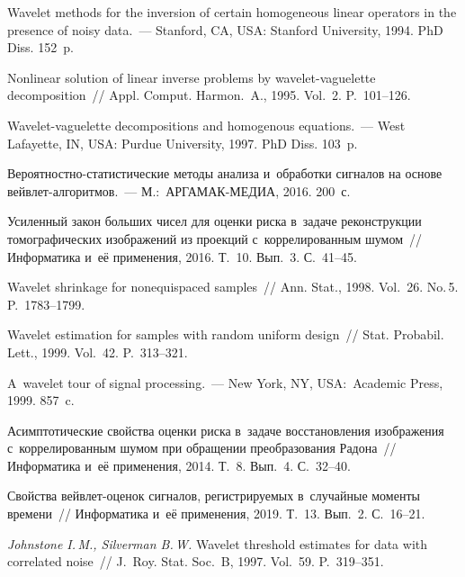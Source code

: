 \begin{multicols}{2}
{\small\frenchspacing
 {%
 \begin{thebibliography}{99}



 Wavelet methods for the inversion of certain 
homogeneous linear operators in the presence of noisy data.~--- 
Stanford, CA, USA: Stanford University, 1994. PhD Diss. 152~p. 

 Nonlinear solution of linear inverse problems by 
wavelet-vaguelette decomposition~// Appl. Comput. Harmon.~A., 1995. Vol.~2. 
P.~101--126.

 Wavelet-vaguelette decompositions and homogenous equations.~--- 
West Lafayette, IN, USA: Purdue University, 1997. PhD Diss. 103~p.

 Вероятностно-статистические методы анализа 
и~обработки сигналов на основе вейвлет-ал\-го\-рит\-мов.~--- М.:~АРГАМАК-МЕДИА, 
2016. 200~с.

 Усиленный закон больших чисел для оценки риска 
в~задаче реконструкции томографических изображений из проекций 
с~коррелированным шумом~// Информатика и~её применения, 2016. Т.~10. 
Вып.~3. С.~41--45.

 Wavelet shrinkage for nonequispaced samples~// Ann. 
Stat., 1998. Vol.~26. No.\,5.  
P.~1783--1799.

 Wavelet estimation for samples with random uniform 
design~// Stat. Probabil. Lett., 1999. Vol.~42. P.~313--321.

 A~wavelet tour of signal processing.~--- New York, NY, 
USA:~Academic Press, 1999. 857~c.

 Асимптотические свойства оценки 
риска в~задаче восстановления изоб\-ра\-же\-ния с~коррелированным шумом при 
обращении преобразования Радона~// Информатика и~её применения, 2014. 
Т.~8. Вып.~4. 
С.~32--40.

 Свойства вейвлет-оценок сигналов, регистрируемых 
в~случайные моменты времени~// Информатика и~её применения, 2019. Т.~13. 
Вып.~2. С.~16--21.

\textit{Johnstone I.\,M., Silverman B.\,W.} Wavelet threshold estimates 
for data with correlated noise~// J.~Roy. Stat. Soc.~B, 1997. 
Vol.~59. P.~319--351.



\end{thebibliography}

 }
 }

\end{multicols}


